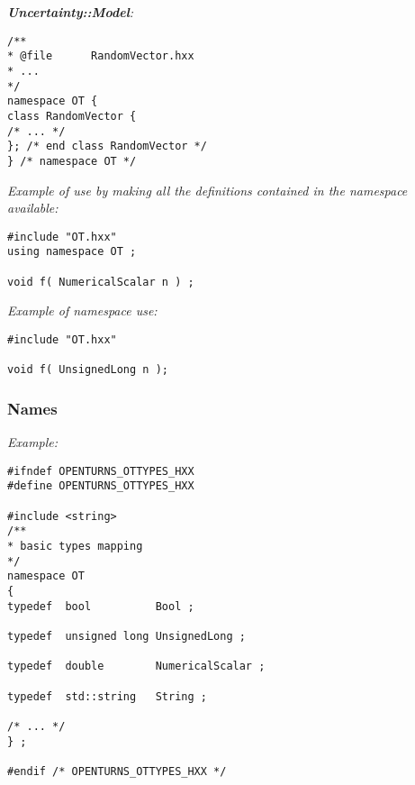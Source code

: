\emph{{\bf Uncertainty::Model}:}
\lstset{language=C++, basicstyle=\normalsize}
\begin{lstlisting}[frame=TBRL]
/**
* @file      RandomVector.hxx
* ...
*/
namespace OT {
class RandomVector {
/* ... */
}; /* end class RandomVector */
} /* namespace OT */
\end{lstlisting}

\emph{Example of use by making all the definitions contained in the namespace available:}
\lstset{language=C++, basicstyle=\normalsize}
\begin{lstlisting}[frame=TBRL]
#include "OT.hxx"
using namespace OT ;

void f( NumericalScalar n ) ;
\end{lstlisting}


\emph{Example of namespace use:}
\lstset{language=C++, basicstyle=\normalsize}
\begin{lstlisting}[frame=TBRL]
#include "OT.hxx"

void f( UnsignedLong n );
\end{lstlisting}

\subsubsection{Names}

\emph{Example:}
\lstset{language=C++, basicstyle=\normalsize}
\begin{lstlisting}[frame=TBRL]
#ifndef OPENTURNS_OTTYPES_HXX
#define OPENTURNS_OTTYPES_HXX

#include <string>
/**
* basic types mapping
*/
namespace OT
{
typedef  bool          Bool ;

typedef  unsigned long UnsignedLong ;

typedef  double        NumericalScalar ;

typedef  std::string   String ;

/* ... */
} ;

#endif /* OPENTURNS_OTTYPES_HXX */
\end{lstlisting}


